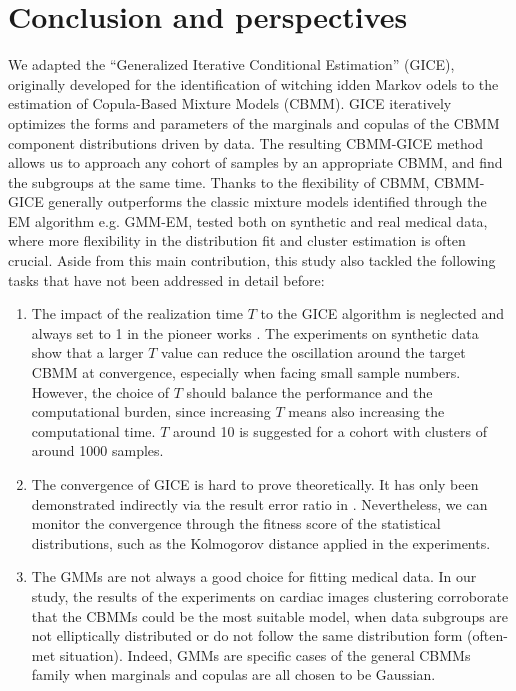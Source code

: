 \section{Conclusion and perspectives}
\label{sec:conclusion}

We adapted the ``Generalized Iterative Conditional Estimation'' (GICE), originally developed for the identification of witching idden Markov odels to the estimation of Copula-Based Mixture Models (CBMM). GICE iteratively optimizes the forms and parameters of the marginals and copulas of the CBMM component distributions driven by data. The resulting CBMM-GICE method allows us to approach any cohort of samples by an appropriate CBMM, and find the subgroups at the same time. Thanks to the flexibility of CBMM, CBMM-GICE generally outperforms the classic mixture models identified through the EM algorithm e.g. GMM-EM, tested both on synthetic and real medical  data, where more flexibility in the distribution fit and cluster estimation is often crucial. Aside from this main contribution, this study also tackled the following tasks that have not been addressed in detail before:
\begin{enumerate}
    \item The impact of the realization time $T$ to the GICE algorithm is neglected and always set to 1 in the pioneer works \cite{zheng2020semi,derrode2016unsupervised}. The experiments on synthetic data show that a larger $T$ value can reduce the oscillation around the target CBMM at convergence, especially when facing small sample numbers. However, the choice of $T$ should balance the performance and the computational burden, since increasing $T$ means also increasing the computational time. $T$ around 10 is suggested for a cohort with clusters of around 1000 samples.
    \item The convergence of GICE is hard to prove theoretically. It has only been demonstrated indirectly via the result error ratio in \cite{zheng2020semi}. Nevertheless, we can monitor the convergence through the fitness score of the statistical distributions, such as the Kolmogorov distance applied in the experiments. 
    \item The GMMs are not always a good choice for fitting medical data. 
    In our study, the results of the experiments on cardiac images clustering corroborate that the CBMMs could be the most suitable model, when data subgroups are not elliptically distributed or do not follow the same distribution form (often-met situation). Indeed, GMMs are specific cases of the general CBMMs family when marginals and copulas are all chosen to be Gaussian. 
\end{enumerate}

